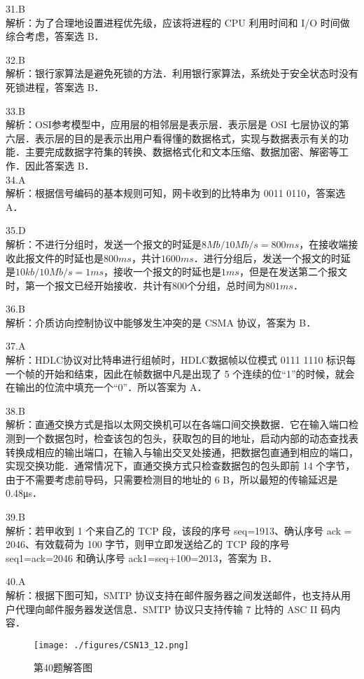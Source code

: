 31.B \\
解析：为了合理地设置进程优先级，应该将进程的 CPU 利用时间和 I/O 时间做综合考虑，答案选 B．

32.B \\
解析：银行家算法是避免死锁的方法．利用银行家算法，系统处于安全状态时没有死锁进程，答案选 B．

33.B \\
解析：OSI参考模型中，应用层的相邻层是表示层．表示层是 OSI 七层协议的第六层．表示层的目的是表示出用户看得懂的数据格式，实现与数据表示有关的功能．主要完成数据字符集的转换、数据格式化和文本压缩、数据加密、解密等工作．因此答案选 B． \\

34.A \\
解析：根据信号编码的基本规则可知，网卡收到的比特串为 0011 0110，答案选 A．

35.D \\
解析：不进行分组时，发送一个报文的时延是$8Mb/10Mb/s=800ms$，在接收端接收此报文件的时延也是$800ms$，共计$1600ms$．进行分组后，发送一个报文的时延是$10kb/10Mb/s=1ms$，接收一个报文的时延也是$1ms$，但是在发送第二个报文时，第一个报文已经开始接收．共计有$800$个分组，总时间为$801ms$．

36.B \\
解析：介质访向控制协议中能够发生冲突的是 CSMA 协议，答案为 B．

37.A \\
解析：HDLC协议对比特串进行组帧时，HDLC数据帧以位模式 0111 1110 标识每一个帧的开始和结束，因此在帧数据中凡是出现了 5 个连续的位“1”的时候，就会在输出的位流中填充一个“0”．所以答案为 A．

38.B \\
解析：直通交换方式是指以太网交换机可以在各端口间交换数据．它在输入端口检测到一个数据包时，检查该包的包头，获取包的目的地址，启动内部的动态查找表转换成相应的输出端口，在输入与输出交叉处接通，把数据包直通到相应的端口，实现交换功能．通常情况下，直通交换方式只检查数据包的包头即前 14 个字节，由于不需要考虑前导码，只需要检测目的地址的 6 B，所以最短的传输延迟是 0.48μs．

39.B \\
解析：若甲收到 1 个来自乙的 TCP 段，该段的序号 seq=1913、确认序号 ack = 2046、有效载荷为 100 字节，则甲立即发送给乙的 TCP 段的序号 seq1=ack=2046 和确认序号 ack1=seq+100=2013，答案为 B．

40.A \\
解析：根据下图可知，SMTP 协议支持在邮件服务器之间发送邮件，也支持从用户代理向邮件服务器发送信息．SMTP 协议只支持传输 7 比特的 ASC II 码内容．
\begin{figure}[ht]
\centering
\texttt{[image: ./figures/CSN13\_12.png]}
\caption{第40题解答图} \label{CSN13_fig12}
\end{figure}

